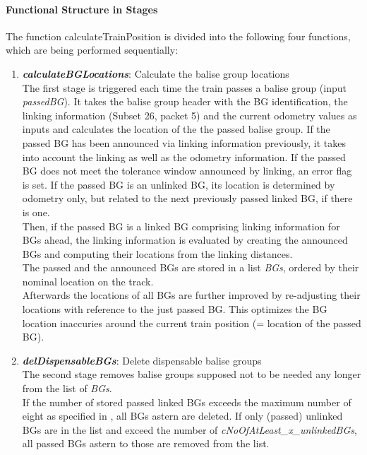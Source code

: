 \paragraph{Functional Structure in Stages}
The function calculateTrainPosition is divided into the following four functions, which are being performed sequentially: 
\begin{enumerate}
\item \textbf{\textit{calculateBGLocations}}: Calculate the balise group locations\\
The first stage is triggered each time the train passes a balise group (input \textit{passedBG}). It takes the balise group header with the BG identification, the linking information (Subset 26, packet 5) and the current odometry values as inputs and calculates the location of the the passed balise group. If the passed BG has been announced via linking information previously, it takes into account the linking as well as the odometry information. If the passed BG does not meet the tolerance window announced by linking, an error flag is set. If the passed BG is an unlinked BG, its location is determined by odometry only, but related to the next previously passed linked BG, if there is one.\\
Then, if the passed BG is a linked BG comprising linking information for BGs ahead, the linking information is evaluated by creating the announced BGs and computing their locations from the linking distances.\\
The passed and the announced BGs are stored in a list \textit{BGs}, ordered by their nominal location on the track.\\
Afterwards the locations of all BGs are further improved by re-adjusting their locations with reference to the just passed BG. This optimizes the BG location inaccuries around the current train position (= location of the passed BG). 

\item \textbf{\textit{delDispensableBGs}}: Delete dispensable balise groups\\
The second stage removes balise groups supposed not to be needed any longer from the list of \textit{BGs}.\\
If the number of stored passed linked BGs exceeds the maximum number of eight as specified in \cite[Chapter~3.6.2.2.2 c]{subset-026}, all BGs astern are deleted.
If only (passed) unlinked BGs are in the list and exceed the number of \textit{cNoOfAtLeast\_x\_unlinkedBGs}, all passed BGs astern to those are removed from the list. 


\end{enumerate}
